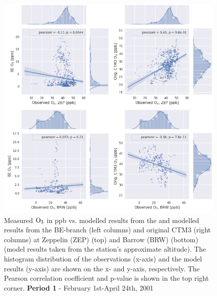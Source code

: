 \begin{figure}[ht]
    \centering
    \includegraphics[width = \linewidth]{Chapter6_Results/images/Orig_BE_comp/jointplot_FebApr_ZEPBRW_O3_2001.png}
    \caption{Measured $\mathrm{O_3}$ in ppb vs. modelled results from the and modelled results from the BE-branch (left columns) and original CTM3 (right columns) at  Zeppelin (ZEP) (top) and Barrow (BRW) (bottom) (model results taken from the station's approximate altitude). The histogram distribution of the observations (x-axis) and the model results (y-axis) are shown on the x- and y-axis, respectively. The Pearson correlation coefficient and p-value is shown in the top right corner. \textbf{Period 1} - February 1st-April 24th, 2001}
    \label{fig:joint_FebApr_ZEPBRW}
\end{figure}